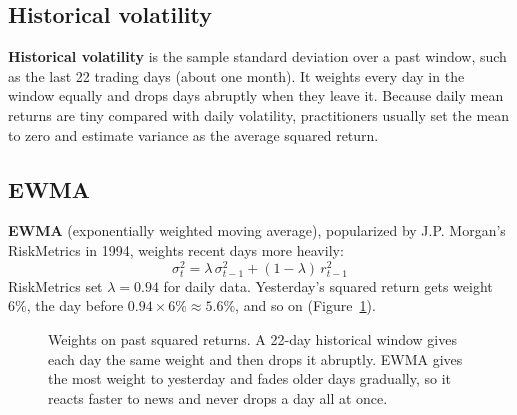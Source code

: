 \subsection{Historical volatility}

\textbf{Historical volatility} is the sample standard deviation over a past window, such as the last 22 trading days (about one month). It weights every day in the window equally and drops days abruptly when they leave it. Because daily mean returns are tiny compared with daily volatility, practitioners usually set the mean to zero and estimate variance as the average squared return.

\subsection{EWMA}

\textbf{EWMA} (exponentially weighted moving average), popularized by J.P. Morgan's RiskMetrics in 1994, weights recent days more heavily:
\begin{equation}
  \sigma^2_t = \lambda\,\sigma^2_{t-1} + (1 - \lambda)\,r^2_{t-1}
  \label{eq:11-ewma}
\end{equation}
RiskMetrics set $\lambda = 0.94$ for daily data. Yesterday's squared return gets weight 6\%, the day before $0.94 \times 6\% \approx 5.6\%$, and so on (Figure~\ref{fig:11-ewma}).

\begin{figure}[htbp]
\centering
{}
\caption{Weights on past squared returns. A 22-day historical window gives each day the same weight and then drops it abruptly. EWMA gives the most weight to yesterday and fades older days gradually, so it reacts faster to news and never drops a day all at once.}
\label{fig:11-ewma}
\end{figure}

